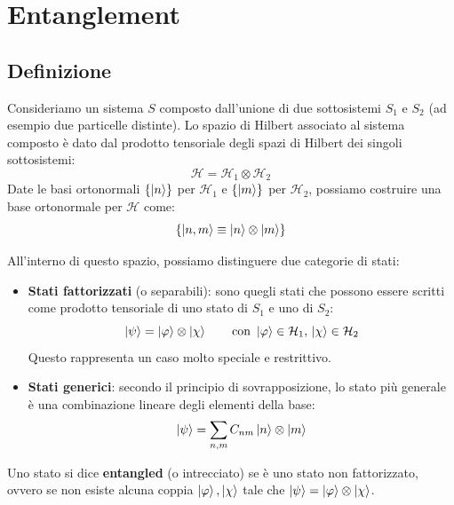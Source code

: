 \chapter{Entanglement}
\section{Definizione}

Consideriamo un sistema \( S \) composto dall'unione di due sottosistemi \( S_1 \) e \( S_2 \) (ad esempio due particelle distinte).
Lo spazio di Hilbert associato al sistema composto è dato dal prodotto tensoriale degli spazi di Hilbert dei singoli sottosistemi:
\[
    \mathcal{H} = \mathcal{H}_1 \otimes \mathcal{H}_2
\]
Date le basi ortonormali \( \{\ket{n}\} \) per \( \mathcal{H}_1 \) e \( \{\ket{m}\} \) per \( \mathcal{H}_2 \), possiamo costruire una base ortonormale per \( \mathcal{H} \) come:
\[
    \left\{ \ket{n,m} \equiv \ket{n} \otimes \ket{m} \right\}
\]

All'interno di questo spazio, possiamo distinguere due categorie di stati:

\begin{itemize}
    \item \textbf{Stati fattorizzati} (o separabili): sono quegli stati che possono essere scritti come prodotto tensoriale di uno stato di \( S_1 \) e uno di \( S_2 \):
    \[
        \ket{\psi} = \ket{\varphi} \otimes \ket{\chi} \qquad \text{con } \ket{\varphi} \in \mathcal{H}_1, \, \ket{\chi} \in \mathcal{H}_2
    \]
    Questo rappresenta un caso molto speciale e restrittivo.

    \item \textbf{Stati generici}: secondo il principio di sovrapposizione, lo stato più generale è una combinazione lineare degli elementi della base:
    \[
        \ket{\psi} = \sum_{n,m} C_{nm} \ket{n} \otimes \ket{m}
    \]
\end{itemize}

\begin{definition}
    Uno stato si dice \textbf{entangled} (o intrecciato) se è uno stato non fattorizzato, ovvero se non esiste alcuna coppia \( \ket{\varphi}, \ket{\chi} \) tale che \( \ket{\psi} = \ket{\varphi} \otimes \ket{\chi} \).
\end{definition}

